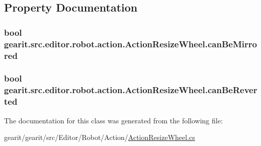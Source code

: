 \subsection{Property Documentation}
\hypertarget{classgearit_1_1src_1_1editor_1_1robot_1_1action_1_1_action_resize_wheel_a2304d0f3f186142833a12c636947026b}{
\subsubsection[{can\+Be\+Mirrored}]{\setlength{\rightskip}{0pt plus 5cm}bool gearit.\+src.\+editor.\+robot.\+action.\+Action\+Resize\+Wheel.\+can\+Be\+Mirrored\hspace{0.3cm}{\ttfamily [get]}}}\label{classgearit_1_1src_1_1editor_1_1robot_1_1action_1_1_action_resize_wheel_a2304d0f3f186142833a12c636947026b}
\hypertarget{classgearit_1_1src_1_1editor_1_1robot_1_1action_1_1_action_resize_wheel_a5916ffcbba1679f8ad87012cd6668757}{
\subsubsection[{can\+Be\+Reverted}]{\setlength{\rightskip}{0pt plus 5cm}bool gearit.\+src.\+editor.\+robot.\+action.\+Action\+Resize\+Wheel.\+can\+Be\+Reverted\hspace{0.3cm}{\ttfamily [get]}}}\label{classgearit_1_1src_1_1editor_1_1robot_1_1action_1_1_action_resize_wheel_a5916ffcbba1679f8ad87012cd6668757}


The documentation for this class was generated from the following file\+:\begin{DoxyCompactItemize}
\item 
gearit/gearit/src/\+Editor/\+Robot/\+Action/\hyperlink{_action_resize_wheel_8cs}{Action\+Resize\+Wheel.\+cs}\end{DoxyCompactItemize}
